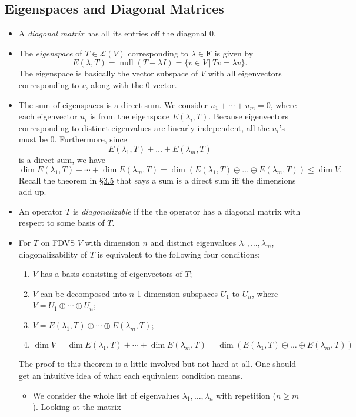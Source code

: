 \documentclass[11pt]{article}
\newcommand{\lk}[2]{\hyperlink{subsection.#1.#2}{\S#1.#2}}
\newcommand{\where}{\,|\,}
\newcommand{\df}[1]{\textit{\textsf{#1}}}
\newcommand{\F}{\mathbf{F}}
\newcommand{\n}{\operatorname{null}}
\renewcommand{\d}{\dim}
\newcommand{\LV}{\mathcal{L}(V)}
\begin{document}
\subsection{Eigenspaces and Diagonal Matrices}
\begin{itemize}
    \item A \df{diagonal matrix} has all its entries off the diagonal 0.
    \item The \df{eigenspace} of $T \in \LV$ corresponding to $\lambda \in \F$ is given by $$E(\lambda,T) = \n (T-\lambda I) = \{v \in V \where Tv = \lambda v\}.$$
    The eigenspace is basically the vector subspace of $V$ with all eigenvectors corresponding to $v$, along with the 0 vector.
    \item The sum of eigenspaces is a direct sum. We consider $u_1+\cdots+u_m = 0$, where each eigenvector $u_i$ is from the eigenspace $E(\lambda_i,T)$. Because eigenvectors corresponding to distinct eigenvalues are linearly independent, all the $u_i$'s must be 0. Furthermore, since $$E(\lambda_1,T)+\dots+E(\lambda_m,T)$$ is a direct sum, we have $$\d E(\lambda_1,T) + \cdots + \d E(\lambda_m,T) = \d (E(\lambda_1,T) \oplus \dots \oplus E(\lambda_m,T)) \leq \d V.$$ Recall the theorem in \lk{3}{5} that says a sum is a direct sum iff the dimensions add up.
    \item An operator $T$ is \df{diagonalizable} if the the operator has a diagonal matrix with respect to some basis of $T$.
    \item For $T$ on FDVS $V$ with dimension $n$ and distinct eigenvalues $\lambda_1, \dots, \lambda_m$, diagonalizability of $T$ is equivalent to the following four conditions:
    \begin{enumerate}[label=(\alph*)]
        \item $V$ has a basis consisting of eigenvectors of $T$;
        \item $V$ can be decomposed into $n$ 1-dimension subspaces $U_1$ to $U_n$, where $V = U_1 \oplus \cdots \oplus U_n$;
        \item $V = E(\lambda_1,T) \oplus \cdots \oplus E(\lambda_m,T)$;
        \item $\d V = \d E(\lambda_1,T) + \cdots + \d E(\lambda_m,T) = \d (E(\lambda_1,T) \oplus \dots \oplus E(\lambda_m,T))$
    \end{enumerate}
    The proof to this theorem is a little involved but not hard at all. One should get an intuitive idea of what each equivalent condition means.
    \begin{itemize}
    \item We consider the whole list of eigenvalues $\lambda_1, \dots, \lambda_n$ with repetition ($n \geq m$). Looking at the matrix

\end{itemize}
\end{itemize}
\end{document}
